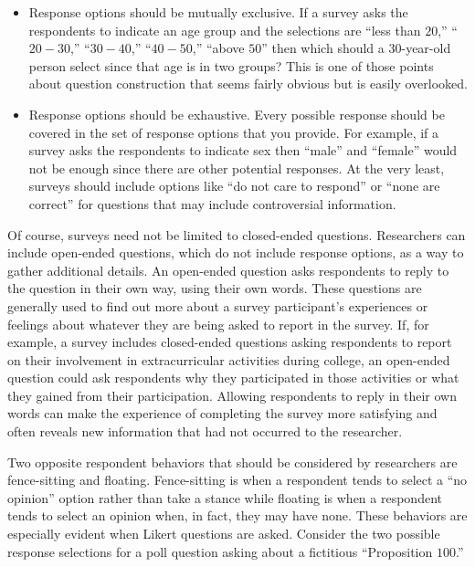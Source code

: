 \begin{itemize}
	\item Response options should be mutually exclusive. If a survey asks the respondents to indicate an age group and the selections are ``less than $ 20 $,'' ``$ 20-30 $,'' ``$ 30-40 $,'' ``$ 40-50 $,'' ``above $ 50 $'' then which should a $ 30 $-year-old person select since that age is in two groups? This is one of those points about question construction that seems fairly obvious but is easily overlooked. 

	\item Response options should be exhaustive. Every possible response should be covered in the set of response options that you provide. For example, if a survey asks the respondents to indicate sex then ``male'' and ``female'' would not be enough since there are other potential responses. At the very least, surveys should include options like ``do not care to respond'' or ``none are correct'' for questions that may include controversial information.
\end{itemize}

Of course, surveys need not be limited to closed-ended questions. Researchers can include open-ended questions, which do not include response options, as a way to gather additional details. An open-ended question asks respondents to reply to the question in their own way, using their own words. These questions are generally used to find out more about a survey participant's experiences or feelings about whatever they are being asked to report in the survey. If, for example, a survey includes closed-ended questions asking respondents to report on their involvement in extracurricular activities during college, an open-ended question could ask respondents why they participated in those activities or what they gained from their participation. Allowing respondents to reply in their own words can make the experience of completing the survey more satisfying and often reveals new information that had not occurred to the researcher.

Two opposite respondent behaviors that should be considered by researchers are fence-sitting and floating. Fence-sitting is when a respondent tends to select a ``no opinion'' option rather than take a stance while floating is when a respondent tends to select an opinion when, in fact, they may have none. These behaviors are especially evident when Likert questions are asked. Consider the two possible response selections for a poll question asking about a fictitious ``Proposition $ 100 $.''

